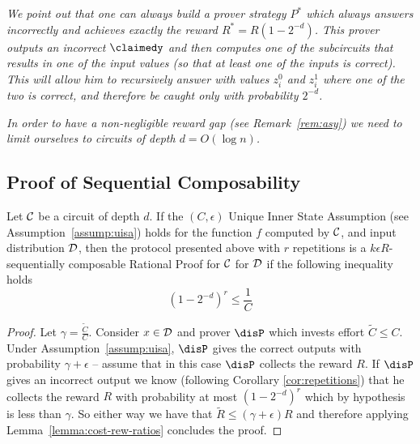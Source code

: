 \begin{remark}
\label{rem:match}
{\em 
We point out that one can always build a prover strategy 
$P^*$ which always answers incorrectly and achieves exactly the reward 
$R^*=R(1-2^{-d})$. This prover outputs an incorrect 
$\claimedy$ and then computes one of the subcircuits that results in one of the input values (so that at least one of the inputs is correct). This will allow him to recursively answer with values $z^0_i$ and $z^1_i$ where one of the two is correct, and therefore be caught only with probability $2^{-d}$.
}
\end{remark}

\begin{remark}
\label{rem:logd}
{\em 
In order to have a non-negligible reward gap (see Remark~\ref{rem:asy}) we need
to limit ourselves to circuits of depth $d=O(\log n)$. 
}
\end{remark}

\subsection{Proof of Sequential Composability}
\label{sec:proof-comp}


\begin{lemma}
	Let $\cal{C}$ be a circuit of depth $d$. If the $(C,\epsilon)$ Unique Inner State Assumption (see Assumption~\ref{assump:uisa}) holds for the function $f$ computed by $\cal C$, and input distribution $\cal D$, then the protocol presented above with $r$ repetitions is a $k\epsilon R$-sequentially composable Rational Proof for $\cal{C}$ for $\cal D$ if the following inequality holds 
	$$ (1-2^{-d})^r \leq \frac{1}{C} $$
\end{lemma}
\begin{proof}
Let $\gamma=\frac{\tilde{C}}{C}$. 
Consider $x \in \cal D$ and prover $\disP$ which invests effort $\tilde{C}\leq C$. Under Assumption~\ref{assump:uisa}, $\disP$ gives the correct outputs
with probability $\gamma+\epsilon$ -- assume that in this case $\disP$ collects the reward $R$. If $\disP$ gives an incorrect output we know (following Corollary \ref{cor:repetitions}) that he collects the reward 
$R$ with probability at most $(1-2^{-d})^r$ which by hypothesis is less than $\gamma$. So either way we have that $\tilde{R} \leq (\gamma + \epsilon)R$ 
and therefore applying Lemma~\ref{lemma:cost-rew-ratios} concludes the proof.
\end{proof}

